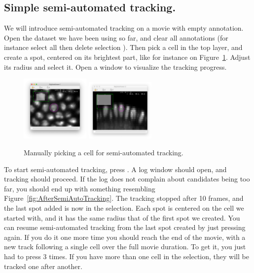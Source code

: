 \subsection{Simple semi-automated tracking.}

We will introduce semi-automated tracking on a movie with empty annotation. 
Open the dataset we have been using so far, and clear all annotations (for instance select all  then delete selection \keys{\shift+\backdel}).
Then pick a cell in the top layer, and create a spot, centered on its brightest part, like for instance on Figure~\ref{fig:BeforeSemiAutoTracking}.
Adjust its radius and select it.
Open a \TrackScheme window to visualize the tracking progress.

\begin{figure}
    \centering
    \null\hfill
    \includegraphics[width=0.3\textwidth]{figures/Mastodon_SemiAutoTracking_01a.png}
    \hfill
    \includegraphics[width=0.3\textwidth]{figures/Mastodon_SemiAutoTracking_01b.png}
    \hfill\null
    \caption{Manually picking a cell for semi-automated tracking.}
    \label{fig:BeforeSemiAutoTracking}
\end{figure}

To start semi-automated tracking, press .
A log window should open, and tracking should proceed. 
If the log does not complain about candidates being too far, you should end up with something resembling Figure~\ref{fig:AfterSemiAutoTracking}.
The tracking stopped after 10 frames, and the last spot added is now in the selection. 
Each spot is centered on the cell we started with, and it has the same radius that of the first spot we created. 
You can resume semi-automated tracking from the last spot created by just pressing  again. 
If you do it one more time you should reach the end of the movie, with a new track following a single cell over the full movie duration.
To get it, you just had to press  3 times.
If you have more than one cell in the selection, they will be tracked one after another.

